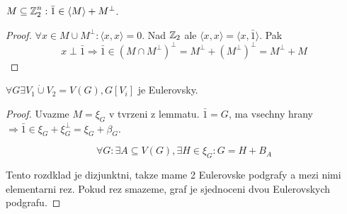 \begin{lemma}
	$M \subseteq \operatorname{\mathbb{Z}}_2^n : \bar{1} \in \langle M \rangle + M^{\perp}$.
\end{lemma}
\begin{proof}
	$\forall x \in M \cup M^{\perp}: \langle x, x \rangle = 0$. Nad $\operatorname{\mathbb{Z}}_2$ ale $\langle x, x \rangle = \langle x, \bar{1} \rangle$. Pak
	\[ x \perp \bar{1} \Rightarrow \bar{1} \in (M \cap M^{\perp})^{\perp} = M^{\perp} + (M^{\perp})^{\perp} = M^{\perp} + M \]
\end{proof}

\begin{theorem}
	$\forall G \exists V_1 \mathbin{\dot{\cup}} V_2 = V(G), G[V_i]$ je Eulerovsky.
\end{theorem}
\begin{proof}
	Uvazme $M = \xi_G$ v tvrzeni z lemmatu. $\bar{1} = G$, ma vsechny hrany $\Rightarrow \bar{1} \in \xi_G + \xi_G^{\perp} = \xi_G + \beta_G$.

	\[ \forall G: \exists A \subseteq V(G), \exists H\in \xi_G: G = H + B_A \]

	Tento rozdklad je dizjunktni, takze mame 2 Eulerovske podgrafy a mezi nimi elementarni rez. Pokud rez smazeme, graf je sjednoceni dvou Eulerovskych podgrafu.

\end{proof}
